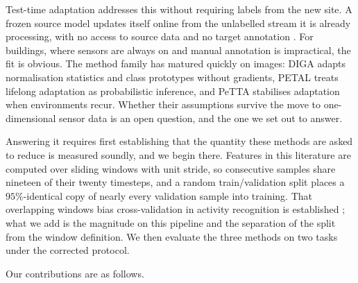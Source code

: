 \documentclass[a4paper,fleqn]{cas-dc}
\begin{document}
Test-time adaptation addresses this without requiring labels from the new site. A frozen
source model updates itself online from the unlabelled stream it is already processing,
with no access to source data and no target annotation \cite{liang2024}. For buildings,
where sensors are always on and manual annotation is impractical, the fit is obvious. The
method family has matured quickly on images: DIGA \cite{diga} adapts normalisation
statistics and class prototypes without gradients, PETAL \cite{petal} treats lifelong
adaptation as probabilistic inference, and PeTTA \cite{petta} stabilises adaptation when
environments recur. Whether their assumptions survive the move to one-dimensional sensor
data is an open question, and the one we set out to answer.

Answering it requires first establishing that the quantity these methods are asked to
reduce is measured soundly, and we begin there. Features in this literature are computed
over sliding windows with unit stride, so consecutive samples share nineteen of their
twenty timesteps, and a random train/validation split places a $95\%$-identical copy of
nearly every validation sample into training. That overlapping windows bias cross-validation
in activity recognition is established \cite{hammerla2015}; what we add is the magnitude on
this pipeline and the separation of the split from the window definition. We then evaluate
the three methods on two tasks under the corrected protocol.

Our contributions are as follows.
\end{document}
